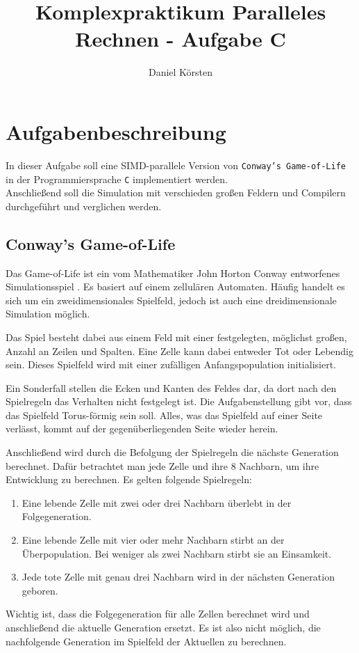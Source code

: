\documentclass[german,plainarticle,hyperref,utf8]{zihpub}
\author{Daniel Körsten}
\title{Komplexpraktikum Paralleles Rechnen - Aufgabe C}
\begin{document}
	\section{Aufgabenbeschreibung}
	In dieser Aufgabe soll eine SIMD-parallele Version von \texttt{Conway’s Game-of-Life} in der Programmiersprache \texttt{C} implementiert werden.\\
	Anschließend soll die Simulation mit verschieden großen Feldern und Compilern durchgeführt und verglichen werden.
	
	\subsection{Conway’s Game-of-Life}
	Das Game-of-Life ist ein vom Mathematiker John Horton Conway entworfenes Simulationsspiel \cite{gardner}. Es basiert auf einem zellulären Automaten. Häufig handelt es sich um ein zweidimensionales Spielfeld, jedoch ist auch eine dreidimensionale Simulation möglich.
	
	Das Spiel besteht dabei aus einem Feld mit einer festgelegten, möglichst großen, Anzahl an Zeilen und Spalten. Eine Zelle kann dabei entweder Tot oder Lebendig sein. Dieses Spielfeld wird mit einer zufälligen Anfangspopulation initialisiert.
	
	Ein Sonderfall stellen die Ecken und Kanten des Feldes dar, da dort nach den Spielregeln das Verhalten nicht festgelegt ist. Die Aufgabenstellung gibt vor, dass das Spielfeld Torus-förmig sein soll. Alles, was das Spielfeld auf einer Seite verlässt, kommt auf der gegenüberliegenden Seite wieder herein.
	
	Anschließend wird durch die Befolgung der Spielregeln die nächste Generation berechnet. Dafür betrachtet man jede Zelle und ihre 8 Nachbarn, um ihre Entwicklung zu berechnen. Es gelten folgende Spielregeln:
	\begin{enumerate}
		\item Eine lebende Zelle mit zwei oder drei Nachbarn überlebt in der Folgegeneration.
		\item Eine lebende Zelle mit vier oder mehr Nachbarn stirbt an der Überpopulation. Bei weniger als zwei Nachbarn stirbt sie an Einsamkeit.
		\item Jede tote Zelle mit genau drei Nachbarn wird in der nächsten Generation geboren.
	\end{enumerate}
	Wichtig ist, dass die Folgegeneration für alle Zellen berechnet wird und anschließend die aktuelle Generation ersetzt. Es ist also nicht möglich, die nachfolgende Generation im Spielfeld der Aktuellen zu berechnen.
	
\end{document}
